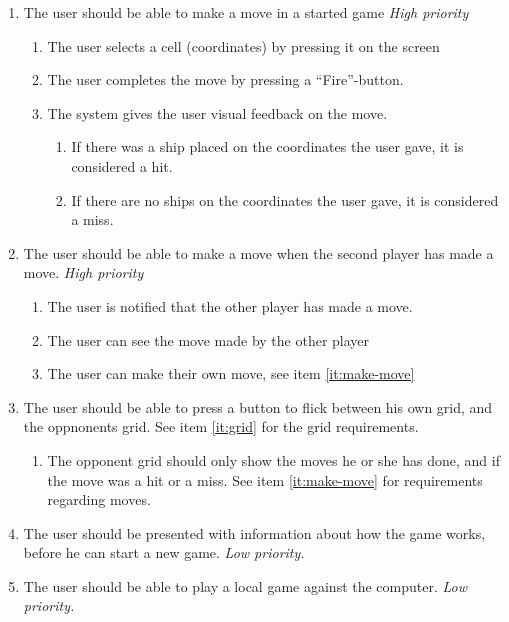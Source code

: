 \begin{enumerate}[label= {\bf FR \arabic*}]
    \item The user should be able to make a move in a started game \label{it:make-move} \textit{High priority}
        \begin{enumerate}[label={\bf \ref{it:make-move}.\arabic*}]
            \item The user selects a cell (coordinates) by pressing it on the screen
            \item The user completes the move by pressing a ``Fire''-button. 
            \item \label{it:visual-feedback-on-move}The system gives the user visual feedback on the move.
            \begin{enumerate}[label= {\bf \ref{it:visual-feedback-on-move}.\arabic*}]
                \item If there was a ship placed on the coordinates the user gave, it is considered a hit. 
                \item If there are no ships on the coordinates the user gave, it is considered a miss.
            \end{enumerate}
        \end{enumerate}
    \item \label{it:move-on-turn}The user should be able to make a move when the second player has made a move. \textit{High priority}
        \begin{enumerate}[label= {\bf \ref{it:move-on-turn}.\arabic*}]
            \item The user is notified that the other player has made a move. 
            \item The user can see the move made by the other player 
            \item The user can make their own move, see item \ref{it:make-move}
        \end{enumerate}
    \item \label{it:flick-between-grids}The user should be able to press a button to flick between his own grid, and the oppnonents grid. See item \ref{it:grid} for the grid requirements.
    \begin{enumerate}[label= {\bf \ref{it:flick-between-grids}.\arabic*}]
        \item The opponent grid should only show the moves he or she has done, and if the move was a hit or a miss. See item \ref{it:make-move} for requirements regarding moves.
    \end{enumerate}
    \item  \label{it:helpscreen}The user should be presented with information about how the game works, before he can start a new game.  \textit{Low priority.}
    \item \label{it:ai} The user should be able to play a local game against the computer. \textit{Low priority.} %


\end{enumerate}